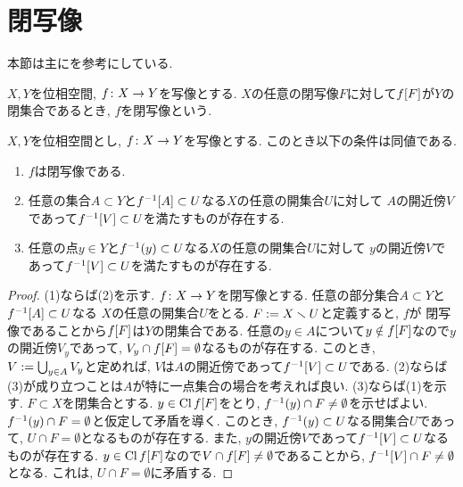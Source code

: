 \documentclass[uplatex, dvipdfmx, a4paper, 12pt, class=jsbook, crop=false]{standalone}
\begin{document}
\section{閉写像}
\label{sec:closed-maps}

\begin{source}
	本節は主に\cite{Engelking1989GT}を参考にしている.
\end{source}

\begin{definition}
	$ X, Y $を位相空間, $ f\colon X\to Y $を写像とする.
	$ X $の任意の閉写像$ F $に対して$ \mapset{f}{F} $が$ Y $の閉集合であるとき,
    $ f $を閉写像という.
\end{definition}

\begin{proposition}
    \label{c00001}
    $ X, Y $を位相空間とし, $ f\colon X\to Y $を写像とする.
    このとき以下の条件は同値である.
    \begin{enumerate}
        \item $ f $は閉写像である.
        \item 任意の集合$ A \subset Y $と$ \mapinvset{f}{A} \subset U $なる$ X $の任意の開集合$ U $に対して
        $ A $の開近傍$ V $であって$ \mapinvset{f}{V} \subset U $を満たすものが存在する.
        \item 任意の点$ y \in Y $と$ \mapinvpt{f}{y} \subset U $なる$ X $の任意の開集合$ U $に対して
        $ y $の開近傍$ V $であって$ \mapinvset{f}{V} \subset U $を満たすものが存在する.
    \end{enumerate}
\end{proposition}

\begin{proof}
    (1)ならば(2)を示す. $ f\colon X\to Y $を閉写像とする.
    任意の部分集合$ A \subset Y $と$ \mapinvset{f}{A} \subset U $なる
    $ X $の任意の開集合$ U $をとる. $ F \mathrel{:=} X \smallsetminus U $と定義すると, $ f $が
    閉写像であることから$ \mapset{f}{F} $は$ Y $の閉集合である.
    任意の$ y \in A $について$ y \notin \mapset{f}{F} $なので$ y $の開近傍$ V_y $であって,
    $ V_y \cap \mapset{f}{F} = \emptyset $なるものが存在する.
    このとき, $ V \mathrel{:=} \bigcup_{y \in A} V_y $と定めれば,
    $ V $は$ A $の開近傍であって$ \mapinvset{f}{V} \subset U $である.
    (2)ならば(3)が成り立つことは$ A $が特に一点集合の場合を考えれば良い.
    (3)ならば(1)を示す. $ F \subset  X $を閉集合とする.
    $ y \in \topcl \mapset{f}{F} $をとり, $ \mapinvpt{f}{y} \cap F \neq \emptyset $を示せばよい.
    $ \mapinvpt{f}{y} \cap F = \emptyset $と仮定して矛盾を導く.
    このとき, $ \mapinvpt{f}{y} \subset U $なる開集合$ U $であって, $ U \cap F = \emptyset $となるものが存在する.
    また, $ y $の開近傍$ V $であって$ \mapinvset{f}{V} \subset U $なるものが存在する.
    $ y \in \topcl \mapset{f}{F} $なので$ V \cap \mapset{f}{F} \neq \emptyset $であることから,
    $ \mapinvset{f}{V} \cap F \neq \emptyset $となる.
    これは, $ U \cap F = \emptyset $に矛盾する.
\end{proof}
\end{document}
